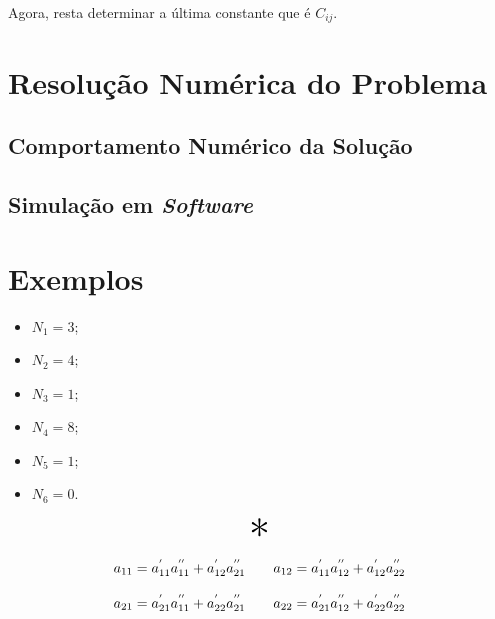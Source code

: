 \documentclass{report}
\let\oldsection\section
\renewcommand\section{\clearpage\oldsection}
\begin{document}
Agora, resta determinar a última constante que é $ C_{ij} $.

\section{Resolução Numérica do Problema}
\label{sec:numerical}
\subsection{Comportamento Numérico da Solução}
\subsection{Simulação em \textit{Software}}

\section{Exemplos}

\begin{itemize}
  \item $ N_1 = 3$;
  \item $ N_2 = 4$;
  \item $ N_3 = 1$;
  \item $ N_4 = 8$;
  \item $ N_5 = 1$;
  \item $ N_6 = 0$.
\end{itemize}

\begin{center}
  \[ \scalebox{3}{$ * $} \]
\end{center}

\begin{equation}
  \label{eq:quad_cascade}
  \centering
  \begin{matrix}
    a_{11} = a^{'}_{11}a^{''}_{11} + a^{'}_{12}a^{''}_{21} & \hspace{10pt} a_{12} = a^{'}_{11}a^{''}_{12} + a^{'}_{12}a^{''}_{22} \\\\
    a_{21} = a^{'}_{21}a^{''}_{11} + a^{'}_{22}a^{''}_{21} & \hspace{10pt} a_{22} = a^{'}_{21}a^{''}_{12} + a^{'}_{22}a^{''}_{22}
  \end{matrix}
\end{equation}
\end{document}
